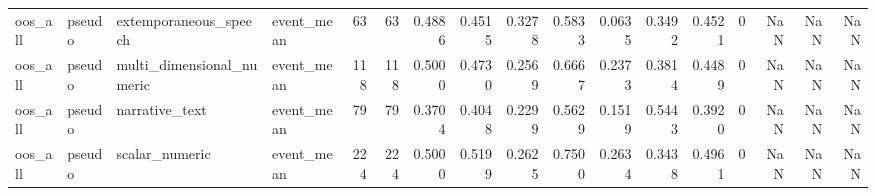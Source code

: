 \begin{tabular}{llllrrrrrrrrrrrrr}
oos_all & pseudo & extemporaneous_speech & event_mean & 63 & 63 & 0.4886 & 0.4515 & 0.3278 & 0.5833 & 0.0635 & 0.3492 & 0.4521 & 0 & NaN & NaN & NaN \\
oos_all & pseudo & multi_dimensional_numeric & event_mean & 118 & 118 & 0.5000 & 0.4730 & 0.2569 & 0.6667 & 0.2373 & 0.3814 & 0.4489 & 0 & NaN & NaN & NaN \\
oos_all & pseudo & narrative_text & event_mean & 79 & 79 & 0.3704 & 0.4048 & 0.2299 & 0.5629 & 0.1519 & 0.5443 & 0.3920 & 0 & NaN & NaN & NaN \\
oos_all & pseudo & scalar_numeric & event_mean & 224 & 224 & 0.5000 & 0.5199 & 0.2625 & 0.7500 & 0.2634 & 0.3438 & 0.4961 & 0 & NaN & NaN & NaN \\
\bottomrule
\end{tabular}
